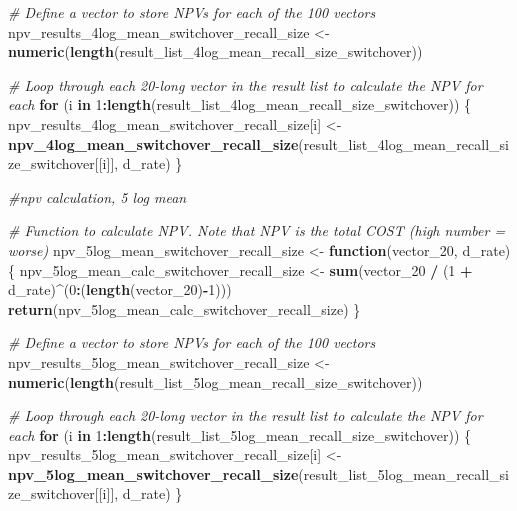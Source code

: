 \documentclass[
]{article}
\newenvironment{Shaded}{\begin{snugshade}}{\end{snugshade}}
\newcommand{\CommentTok}[1]{\textcolor[rgb]{0.56,0.35,0.01}{\textit{#1}}}
\newcommand{\ControlFlowTok}[1]{\textcolor[rgb]{0.13,0.29,0.53}{\textbf{#1}}}
\newcommand{\DecValTok}[1]{\textcolor[rgb]{0.00,0.00,0.81}{#1}}
\newcommand{\FunctionTok}[1]{\textcolor[rgb]{0.13,0.29,0.53}{\textbf{#1}}}
\newcommand{\NormalTok}[1]{#1}
\newcommand{\OtherTok}[1]{\textcolor[rgb]{0.56,0.35,0.01}{#1}}
\newcommand{\SpecialCharTok}[1]{\textcolor[rgb]{0.81,0.36,0.00}{\textbf{#1}}}
\begin{document}
\begin{Shaded}
\begin{Highlighting}[]
\CommentTok{\# Define a vector to store NPVs for each of the 100 vectors}
\NormalTok{npv\_results\_4log\_mean\_switchover\_recall\_size }\OtherTok{\textless{}{-}} \FunctionTok{numeric}\NormalTok{(}\FunctionTok{length}\NormalTok{(result\_list\_4log\_mean\_recall\_size\_switchover))}

\CommentTok{\# Loop through each 20{-}long vector in the result list to calculate the NPV for each}
\ControlFlowTok{for}\NormalTok{ (i }\ControlFlowTok{in} \DecValTok{1}\SpecialCharTok{:}\FunctionTok{length}\NormalTok{(result\_list\_4log\_mean\_recall\_size\_switchover)) \{}
\NormalTok{  npv\_results\_4log\_mean\_switchover\_recall\_size[i] }\OtherTok{\textless{}{-}} \FunctionTok{npv\_4log\_mean\_switchover\_recall\_size}\NormalTok{(result\_list\_4log\_mean\_recall\_size\_switchover[[i]], d\_rate)}
\NormalTok{\}}


\CommentTok{\#npv calculation, 5 log mean}


\CommentTok{\# Function to calculate NPV. Note that NPV is the total COST (high number = worse)}
\NormalTok{npv\_5log\_mean\_switchover\_recall\_size }\OtherTok{\textless{}{-}} \ControlFlowTok{function}\NormalTok{(vector\_20, d\_rate) \{}
\NormalTok{  npv\_5log\_mean\_calc\_switchover\_recall\_size }\OtherTok{\textless{}{-}} \FunctionTok{sum}\NormalTok{(vector\_20 }\SpecialCharTok{/}\NormalTok{ (}\DecValTok{1} \SpecialCharTok{+}\NormalTok{ d\_rate)}\SpecialCharTok{\^{}}\NormalTok{(}\DecValTok{0}\SpecialCharTok{:}\NormalTok{(}\FunctionTok{length}\NormalTok{(vector\_20)}\SpecialCharTok{{-}}\DecValTok{1}\NormalTok{)))}
  \FunctionTok{return}\NormalTok{(npv\_5log\_mean\_calc\_switchover\_recall\_size)}
\NormalTok{\}}

\CommentTok{\# Define a vector to store NPVs for each of the 100 vectors}
\NormalTok{npv\_results\_5log\_mean\_switchover\_recall\_size }\OtherTok{\textless{}{-}} \FunctionTok{numeric}\NormalTok{(}\FunctionTok{length}\NormalTok{(result\_list\_5log\_mean\_recall\_size\_switchover))}

\CommentTok{\# Loop through each 20{-}long vector in the result list to calculate the NPV for each}
\ControlFlowTok{for}\NormalTok{ (i }\ControlFlowTok{in} \DecValTok{1}\SpecialCharTok{:}\FunctionTok{length}\NormalTok{(result\_list\_5log\_mean\_recall\_size\_switchover)) \{}
\NormalTok{  npv\_results\_5log\_mean\_switchover\_recall\_size[i] }\OtherTok{\textless{}{-}} \FunctionTok{npv\_5log\_mean\_switchover\_recall\_size}\NormalTok{(result\_list\_5log\_mean\_recall\_size\_switchover[[i]], d\_rate)}
\NormalTok{\}}



\end{Highlighting}
\end{Shaded}
\end{document}

